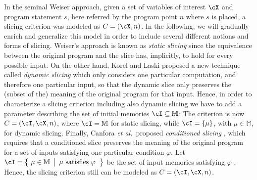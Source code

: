 \documentclass[prodmode,acmtocl]{acmsmall}
\def\memory{\ensuremath{\mu}\xspace}
\def\memories{\ensuremath{\mathbb{M}}\xspace}
\def\crit{\ensuremath{C}\xspace}
\def\etal{{\it et al.\ }}
\newcommand{\sset}[2]{\left\{~#1 ~ \left |
                               \begin{array}{l}#2\end{array}
                          \right.     \right\}}
\newcommand{\0}{\mbox{\bf 0}}
\begin{document}
In the seminal Weiser approach, given a set of variables of interest
$\cX$ and program statement $s$, here referred by the program point
$n$ where $s$ is placed, a slicing criterion was modeled as $\crit =
(\cX,n)$.  In the following, we will gradually enrich and generalize
this model in order to include several different notions and forms of
slicing.  Weiser's approach is known as \emph{static slicing} since
the equivalence between the original program and the slice has,
implicitly, to hold for every possible input.  On the other hand,
Korel and Laski proposed a new technique called \emph{dynamic slicing}
\cite{KorelLaski} which only considers one particular computation, and
therefore one particular input, so that the dynamic slice only
preserves the (subset of the) meaning of the original program for that
input.
Hence, in order to characterize a slicing criterion including also
dynamic slicing we have to add a parameter describing the set of
initial memories $\cI \subseteq \memories$: The criterion is now
$\crit = (\cI,\cX,n)$, where $\cI = \memories$ for static slicing,
while $\cI = \{\memory\}$, with $\memory \in \memories$, for dynamic
slicing.  Finally, Canfora \etal proposed \emph{conditioned slicing}
\cite{Conditioned}, which requires that a conditioned slice preserves
the meaning of the original program for a set of inputs satisfying one
particular condition $\varphi$.  Let
$\cI=\sset{\memory\in\memories}{\memory\ \mbox{satisfies}\ \varphi}$
be the set of input memories satisfying $\varphi$ \cite{AForm}.
Hence, the slicing criterion still can be modeled as
$\crit=(\cI,\cX,n)$.
\end{document}
